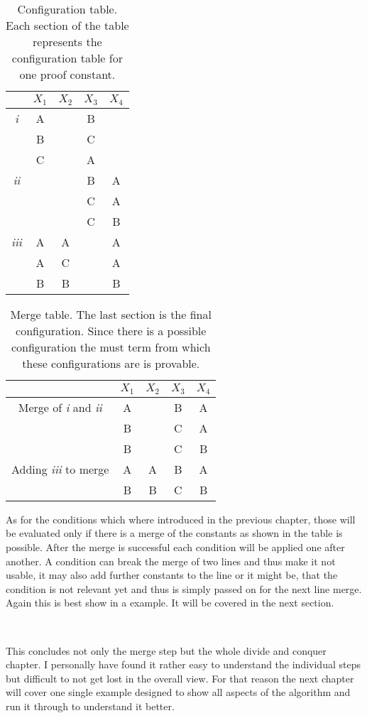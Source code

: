 \vspace{0.2cm}
\begin{table}[ht]
\centering
\begin{tabular}{ c c c c c }
	 & $X_1$ & $X_2$ & $X_3$ & $X_4$\\
 	\hline
 	\emph{i}  	& A 	& 		& B 	& \\
 				& B 	&		& C 	& \\
 				& C 	& 		& A 	& \\
 	\hline
 	\emph{ii}  	& 		&		& B 	& A\\
 				& 	 	&		& C 	& A\\
 				&		&		& C 	& B\\
  	\hline
  	\emph{iii}	& A 	& A 	& 		& A\\
 	  			& A 	& C 	& 		& A\\
 	  			& B 	& B		&		& B\\

 	\hline 
\end{tabular}
\caption{Configuration table. Each section of the table represents the configuration table for one proof constant.}
\end{table}

\vspace{0.2cm}
\begin{table}[ht]
\centering
\begin{tabular}{ c c c c c }
	 & $X_1$ & $X_2$ & $X_3$ & $X_4$\\
 	\hline
 	Merge of \emph{i} and \emph{ii}
 				& A 	& 	 	& B 	& A \\
 	  			& B 	& 	 	& C 	& A \\
 	  			& B 	& 	 	& C 	& B \\
 	\hline	  
 	Adding \emph{iii} to merge
 			  	& A 	& A		& B 	& A\\
 				& B 	& B		& C 	& B\\
 	\hline
 	\hline 
\end{tabular}
\caption{Merge table. The last section is the final configuration. Since there is a possible configuration the must term from which these configurations are is provable.}
\end{table}

As for the conditions which where introduced in the previous chapter, those will be evaluated only if there is a merge of the constants as shown in the table is possible. After the merge is successful each condition will be applied one after another. A condition can break the merge of two lines and thus make it not usable, it may also add further constants to the line or it might be, that the condition is not relevant yet and thus is simply passed on for the next line merge. Again this is best show in a example. It will be covered in the next section.

\\
\par This concludes not only the merge step but the whole divide and conquer chapter. I personally have found it rather easy to understand the individual steps but difficult to not get lost in the overall view. For that reason the next chapter will cover one single example designed to show all aspects of the algorithm and run it through to understand it better.